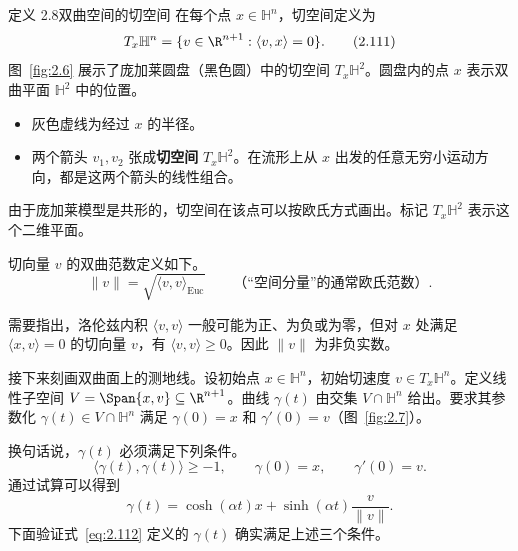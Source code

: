 \begin{statement}{定义 2.8}{双曲空间的切空间}
在每个点 $x\in\mathbb H^n$，切空间定义为
\begin{equation*}
  T_x\mathbb H^n=\{v\in\R^{n+1}:\langle v,x\rangle=0\}.
  \tag{2.111}\label{eq:2.111}
\end{equation*}
图~\ref{fig:2.6} 展示了庞加莱圆盘（黑色圆）中的切空间 $T_x\mathbb H^2$。圆盘内的点 $x$ 表示双曲平面 $\mathbb H^2$ 中的位置。
\begin{itemize}
  \item 灰色虚线为经过 $x$ 的半径。
  \item 两个箭头 $v_1,v_2$ 张成\textbf{切空间} $T_x\mathbb H^2$。在流形上从 $x$ 出发的任意无穷小运动方向，都是这两个箭头的线性组合。
\end{itemize}
由于庞加莱模型是共形的，切空间在该点可以按欧氏方式画出。标记 $T_x\mathbb H^2$ 表示这个二维平面。

\begin{figure}[htbp]
  \centering
  
\end{figure}
切向量 $v$ 的双曲范数定义如下。
\[
  \lVert v\rVert=\sqrt{\langle v,v\rangle_{\mathrm{Euc}}}
  \qquad\text{（“空间分量”的通常欧氏范数）}.
\]

需要指出，洛伦兹内积 $\langle v,v\rangle$ 一般可能为正、为负或为零，但对 $x$ 处满足 $\langle x,v\rangle=0$ 的切向量 $v$，有 $\langle v,v\rangle\geq0$。因此 $\lVert v\rVert$ 为非负实数。

接下来刻画双曲面上的测地线。设初始点 $x\in\mathbb H^n$，初始切速度 $v\in T_x\mathbb H^n$。定义线性子空间 $V=\Span\{x,v\}\subseteq\R^{n+1}$。曲线 $\gamma(t)$ 由交集 $V\cap\mathbb H^n$ 给出。要求其参数化 $\gamma(t)\in V\cap\mathbb H^n$ 满足 $\gamma(0)=x$ 和 $\gamma'(0)=v$（图~\ref{fig:2.7}）。

换句话说，$\gamma(t)$ 必须满足下列条件。
\[
  \langle\gamma(t),\gamma(t)\rangle\geq-1,\qquad
  \gamma(0)=x,\qquad
  \gamma'(0)=v.
\]
通过试算可以得到
\begin{equation*}
  \gamma(t)=\cosh(\alpha t)x+\sinh(\alpha t)\frac{v}{\lVert v\rVert}.
  \tag{2.112}\label{eq:2.112}
\end{equation*}
下面验证式~\eqref{eq:2.112} 定义的 $\gamma(t)$ 确实满足上述三个条件。


\end{statement}
